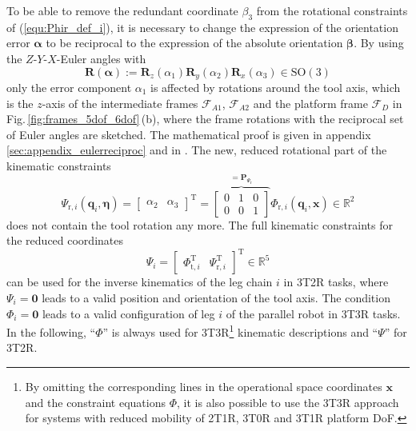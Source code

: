\documentclass[robotics,article,submit,moreauthors,pdftex]{Definitions/mdpi}
\newcommand{\bm}[1]{\boldsymbol{#1}}
\newcommand{\transp}[0]{{\mathrm{T}}}
\newcommand{\ks}[1]{{\mathcal{F}}_{#1}}
\let\Phi\varPhi
\let\Psi\varPsi
\begin{document}
To be able to remove the redundant coordinate $\beta_3$ from the rotational constraints of (\ref{equ:Phir_def_i}), it is necessary to change the expression of the orientation error $\bm{\alpha}$ to be reciprocal to the expression of the absolute orientation $\bm{\beta}$.
By using the $Z$-$Y$-$X$-Euler angles with
%
\begin{equation}
\bm{R}(\bm{\alpha}) := \bm{R}_z(\alpha_1) \bm{R}_y(\alpha_2) \bm{R}_x(\alpha_3) \in \mathrm{SO(3)}
\label{equ:def_rmat_zyxr}
\end{equation}
%
only the error component $\alpha_1$ is affected by rotations around the tool axis, which is the $z$-axis of the intermediate frames $\ks{A1}$, $\ks{A2}$ and the platform frame $\ks{D}$ in Fig.\,\ref{fig:frames_5dof_6dof}\,(b), where the frame rotations with the reciprocal set of Euler angles are sketched.
The mathematical proof is given in appendix\,\ref{sec:appendix_eulerreciproc} and in \cite{1_SchapplerTapOrt2019}.
%
The new, reduced rotational part of the kinematic constraints
%
\begin{equation}
\bm{\Psi}_{\mathrm{r},i}(\bm{q}_i,\bm{\eta}) = 
\begin{bmatrix}
\alpha_2 & \alpha_3
\end{bmatrix}^\transp
=
\overbrace{\begin{bmatrix}
    0 & 1 & 0 \\ 
    0 & 0 & 1
    \end{bmatrix}}^{=\bm{P}_{\bm{\Psi}_\mathrm{r}}}
\bm{\Phi}_{\mathrm{r},i} (\bm{q}_i,\bm{x})
\in {\mathbb{R}}^{2}
\label{equ:Psir_def}
\end{equation}
%
does not contain the tool rotation any more.
The full kinematic constraints for the reduced coordinates
%
\begin{equation}
\bm{\Psi}_i=\begin{bmatrix}
\bm{\Phi}_{\mathrm{t},i}^\transp & \bm{\Psi}_{\mathrm{r},i}^\transp
\end{bmatrix}^\transp \in {\mathbb{R}}^{5}
\label{equ:Psi_def}
\end{equation}
%
can be used for the inverse kinematics of the leg chain $i$ in 3T2R tasks, where $\bm{\Psi}_i=\bm{0}$ leads to a valid position and orientation of the tool axis.
The condition $\bm{\Phi}_i=\bm{0}$ leads to a valid configuration of leg $i$ of the parallel robot in 3T3R tasks.
In the following, ``$\bm{\Phi}$'' is always used for 3T3R\footnote{By omitting the corresponding lines in the operational space coordinates $\bm{x}$ and the constraint equations $\bm{\Phi}$, it is also possible to use the 3T3R approach for systems with reduced mobility of 2T1R, 3T0R and 3T1R platform DoF.} kinematic descriptions and ``$\bm{\Psi}$'' for 3T2R.
\end{document}
